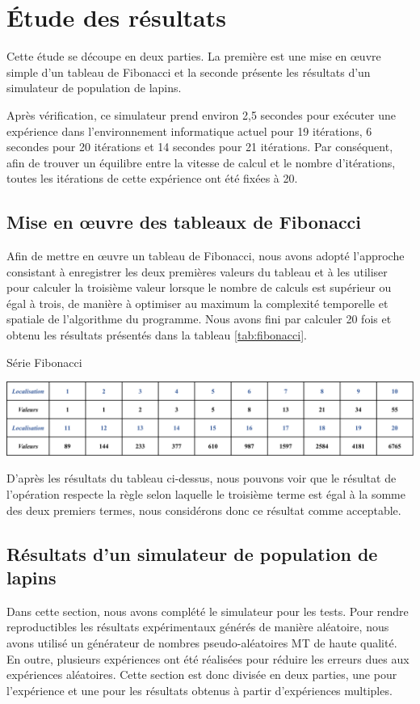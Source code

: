 \documentclass[12pt]{article}
\begin{document}
    \section{Étude des résultats}
    \par
    Cette étude se découpe en deux parties. La première est une mise en œuvre simple d'un tableau de Fibonacci et la seconde présente les résultats d'un simulateur de population de lapins.
    \par
    Après vérification, ce simulateur prend environ 2,5 secondes pour exécuter une expérience dans l'environnement informatique actuel pour 19 itérations, 6 secondes pour 20 itérations et 14 secondes pour 21 itérations. Par conséquent, afin de trouver un équilibre entre la vitesse de calcul et le nombre d'itérations, toutes les itérations de cette expérience ont été fixées à 20.

    \subsection{Mise en œuvre des tableaux de Fibonacci}
    \par
    Afin de mettre en œuvre un tableau de Fibonacci, nous avons adopté l'approche consistant à enregistrer les deux premières valeurs du tableau et à les utiliser pour calculer la troisième valeur lorsque le nombre de calculs est supérieur ou égal à trois, de manière à optimiser au maximum la complexité temporelle et spatiale de l'algorithme du programme. Nous avons fini par calculer 20 fois et obtenu les résultats présentés dans la tableau \ref{tab:fibonacci}.
    \begin{table}[htbp]
        \centering
        \caption{Série Fibonacci}
        \includegraphics[scale =0.75]{Photos/Tableau Fibonacci.png}
        \label{tab:fibonacci}
    \end{table}
    \par
    D'après les résultats du tableau ci-dessus, nous pouvons voir que le résultat de l'opération respecte la règle selon laquelle le troisième terme est égal à la somme des deux premiers termes, nous considérons donc ce résultat comme acceptable.
    
    
    \subsection{Résultats d'un simulateur de population de lapins}
    \par
    Dans cette section, nous avons complété le simulateur pour les tests. Pour rendre reproductibles les résultats expérimentaux générés de manière aléatoire, nous avons utilisé un générateur de nombres pseudo-aléatoires MT\cite{matsumoto1998mersenne} de haute qualité. En outre, plusieurs expériences ont été réalisées pour réduire les erreurs dues aux expériences aléatoires. Cette section est donc divisée en deux parties, une pour l'expérience et une pour les résultats obtenus à partir d'expériences multiples.
\end{document}

